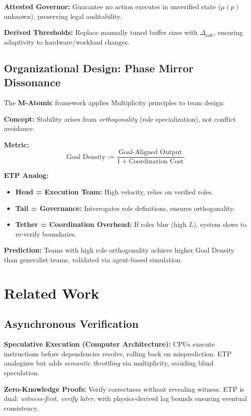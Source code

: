 \documentclass[12pt,a4paper]{article}
\begin{document}
\textbf{Attested Governor:} Guarantee no action executes in unverified state ($\mu(p)$ unknown), preserving legal auditability.

\textbf{Derived Thresholds:} Replace manually tuned buffer sizes with $\Delta_{\text{safe}}$, ensuring adaptivity to hardware/workload changes.

\subsection{Organizational Design: Phase Mirror Dissonance}

The \textbf{M-Atomic} framework applies Multiplicity principles to team design:

\textbf{Concept:} Stability arises from \textit{orthogonality} (role specialization), not conflict avoidance.

\textbf{Metric:}
\[
\text{Goal Density} := \frac{\text{Goal-Aligned Output}}{1 + \text{Coordination Cost}}.
\]

\textbf{ETP Analog:}
\begin{itemize}
\item \textbf{Head = Execution Team:} High velocity, relies on verified roles.
\item \textbf{Tail = Governance:} Interrogates role definitions, ensures orthogonality.
\item \textbf{Tether = Coordination Overhead:} If roles blur (high $L$), system slows to re-verify boundaries.
\end{itemize}

\textbf{Prediction:} Teams with high role orthogonality achieve higher Goal Density than generalist teams, validated via agent-based simulation.

\section{Related Work}

\subsection{Asynchronous Verification}

\textbf{Speculative Execution (Computer Architecture):} CPUs execute instructions before dependencies resolve, rolling back on misprediction. ETP analogizes but adds \textit{semantic throttling} via multiplicity, avoiding blind speculation.

\textbf{Zero-Knowledge Proofs:} Verify correctness without revealing witness. ETP is dual: \textit{witness-first, verify later}, with physics-derived lag bounds ensuring eventual consistency.
\end{document}
